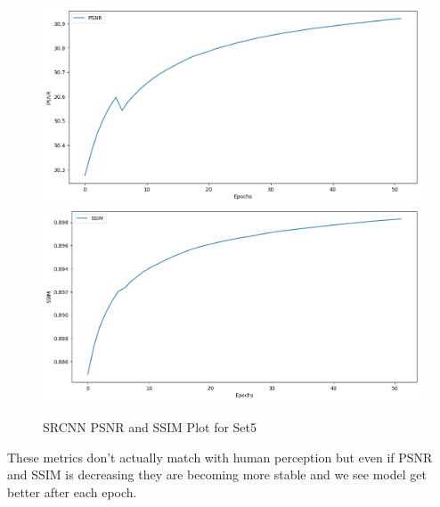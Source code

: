 \begin{figure}[h]
    \centering
    \includegraphics[width=5.5in]{./figures/SRCNN_PSNR.png}
    \includegraphics[width=5.5in]{./figures/SRCNN_SSIM.png}
    \caption{SRCNN PSNR and SSIM Plot for Set5}
\end{figure} 
    These metrics don't actually match with human perception but even if PSNR and SSIM is decreasing they are becoming more stable and we see model get better after each epoch.
\clearpage
\newpage
